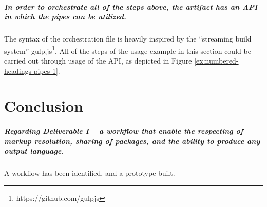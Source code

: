 \documentclass{scrreprt}
\begin{document}
\paragraph{In order to orchestrate all of the steps above, the artifact has an API in which the pipes can be utilized.} The syntax of the orchestration file is heavily inspired by the ``streaming build system'' gulp.js\footnote{ https://github.com/gulpjs}. All of the steps of the usage example in this section could be carried out through usage of the API, as depicted in Figure \ref{ex:numbered-headings-pipes-1}.

























%
%
%
%
%
%

\chapter{Conclusion}

\paragraph{Regarding Deliverable I -- a workflow that enable the respecting of markup resolution, sharing of packages, and the ability to produce any output language. } A workflow has been identified, and a prototype built.
\end{document}
